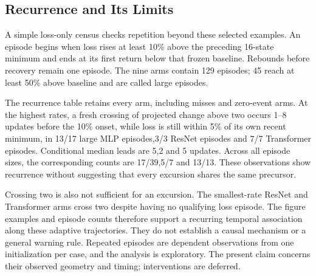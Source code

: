 \subsection{Recurrence and Its Limits}

A simple loss-only census checks repetition beyond these selected examples.
An episode begins when loss rises at least 10\% above the preceding 16-state
minimum and ends at its first return below that frozen baseline. Rebounds
before recovery remain one episode. The nine arms contain 129 episodes;
45 reach at least 50\% above baseline and are called large episodes.

The recurrence table retains every arm, including misses and zero-event arms.
At the highest rates, a fresh crossing of projected change above two occurs
1--8 updates before the 10\% onset, while loss is still within 5\% of its own
recent minimum, in 13/17 large MLP episodes,3/3 ResNet episodes and 7/7 Transformer
episodes. Conditional median leads are 5,2 and 5 updates. Across all episode
sizes, the corresponding counts are 17/39,5/7 and 13/13. These observations show
recurrence without suggesting that every excursion shares the same precursor.

Crossing two is also not sufficient for an excursion. The smallest-rate ResNet
and Transformer arms cross two despite having no qualifying loss episode.
The figure examples and episode counts therefore support a recurring temporal
association along these adaptive trajectories. They do not establish a causal
mechanism or a general warning rule. Repeated episodes are dependent observations
from one initialization per case, and the analysis is exploratory. The present
claim concerns their observed geometry and timing; interventions are deferred.
